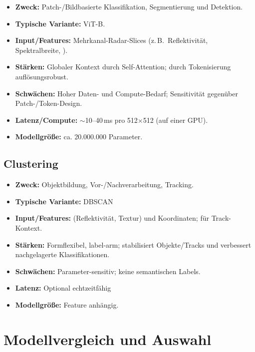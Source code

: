 \begin{itemize}
  \item \textbf{Zweck:} Patch-/Bildbasierte Klassifikation, Segmentierung und Detektion.
  \item \textbf{Typische Variante:} ViT-B.
  \item \textbf{Input/Features:} Mehrkanal-Radar-Slices (z.\,B.\ Reflektivität, Spektralbreite, ).
  \item \textbf{Stärken:} Globaler Kontext durch Self-Attention; durch Tokenisierung auflösungsrobust.
  \item \textbf{Schwächen:} Hoher Daten- und Compute-Bedarf; Sensitivität gegenüber Patch-/Token-Design.
  \item \textbf{Latenz/Compute:}  $\sim$10--40\,ms pro 512$\times$512 (auf einer GPU).
  \item \textbf{Modellgröße:} ca. 20.000.000 Parameter.
\end{itemize}


\subsection*{Clustering}
\begin{itemize}
  \item \textbf{Zweck:} Objektbildung, Vor-/Nachverarbeitung, Tracking.
  \item \textbf{Typische Variante:} DBSCAN
  \item \textbf{Input/Features:} (Reflektivität, Textur) und Koordinaten; für Track-Kontext.
  \item \textbf{Stärken:} Formflexibel, label-arm; stabilisiert Objekte/Tracks und verbessert nachgelagerte Klassifikationen.
  \item \textbf{Schwächen:} Parameter-sensitiv; keine semantischen Labels.
  \item \textbf{Latenz:} Optional echtzeitfähig
  \item \textbf{Modellgröße:} Feature anhängig.
\end{itemize}

\section{Modellvergleich und Auswahl}

